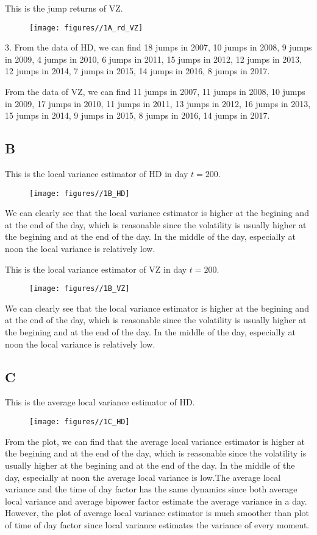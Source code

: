 \documentclass{report}
\begin{document}
This is the jump returns of VZ.
\begin{figure}[H]
        \centering 
         \texttt{[image: figures//1A\_rd\_VZ]}
\end{figure}

3. From the data of HD, we can find 18 jumps in 2007, 10 jumps in 2008,  9 jumps in 2009, 4 jumps in 2010, 6 jumps in 2011, 15 jumps in 2012, 12 jumps in 2013, 12 jumps in 2014, 7 jumps in 2015, 14 jumps in 2016, 8 jumps in 2017.

From the data of VZ, we can find 11 jumps in 2007, 11 jumps in 2008,  10 jumps in 2009, 17 jumps in 2010, 11 jumps in 2011, 13 jumps in 2012, 16 jumps in 2013, 15 jumps in 2014, 9 jumps in 2015, 8 jumps in 2016, 14 jumps in 2017.

\subsection{B}
This is the local variance estimator of HD in day $ t = 200$.
\begin{figure}[H]
        \centering 
         \texttt{[image: figures//1B\_HD]}
\end{figure}
We can clearly see that the local variance estimator is higher at the begining and at the end of the day, which is reasonable since the volatility is usually higher at the begining and at the end of the day. In the middle of the day, especially at noon the local variance is relatively low.

This is the local variance estimator of VZ in day $ t = 200$.
\begin{figure}[H]
        \centering 
         \texttt{[image: figures//1B\_VZ]}
\end{figure}
We can clearly see that the local variance estimator is higher at the begining and at the end of the day, which is reasonable since the volatility is usually higher at the begining and at the end of the day. In the middle of the day, especially at noon the local variance is relatively low.

\subsection{C}
This is the average local variance estimator of HD.
\begin{figure}[H]
        \centering 
         \texttt{[image: figures//1C\_HD]}
\end{figure}
From the plot, we can find that the average local variance estimator is higher at the begining and at the end of the day, which is reasonable since the volatility is usually higher at the begining and at the end of the day. In the middle of the day, especially at noon the average local variance is low.The average local variance and the time of day factor has the same dynamics since both average local variance and average bipower factor estimate the average variance in a day. However, the plot of average local variance estimator is much smoother than plot of time of day factor since local variance estimates the variance of every moment.
\end{document}
